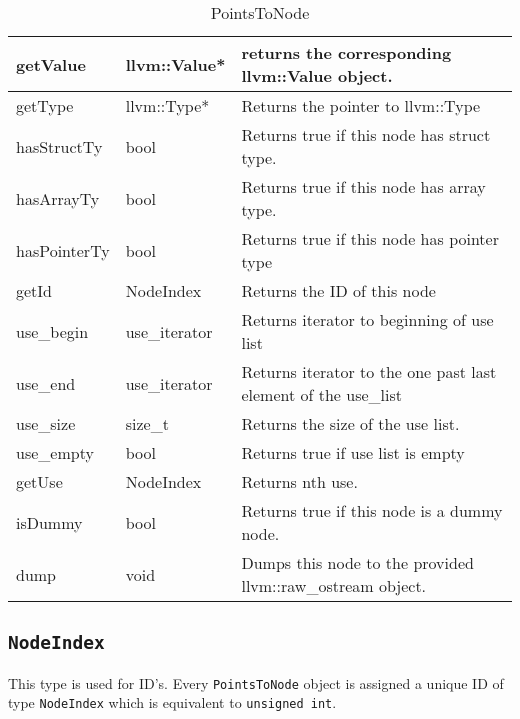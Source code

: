\documentclass[a4paper,12pt]{report}
\begin{document}
\begin{table}[]
\centering
\caption{PointsToNode}
\label{points-to-node}
\begin{tabular}{|l|l|l|}
\hline
getValue     & llvm::Value*  & returns the corresponding llvm::Value object.                               \\ \hline
getType      & llvm::Type*   & Returns the pointer to llvm::Type                                           \\ \hline
hasStructTy  & bool          & Returns true if this node has struct type.                                  \\ \hline
hasArrayTy   & bool          & Returns true if this node has array type.                                   \\ \hline
hasPointerTy & bool          & Returns true if this node has pointer type                                  \\ \hline
getId        & NodeIndex     & Returns the ID of this node                                                 \\ \hline
use\_begin   & use\_iterator & Returns iterator to beginning of use list                                   \\ \hline
use\_end     & use\_iterator & Returns iterator to the one past last element of the use\_list              \\ \hline
use\_size    & size\_t       & Returns the size of the use list.                                           \\ \hline
use\_empty   & bool          & Returns true if use list is empty                                           \\ \hline
getUse       & NodeIndex     & Returns nth use.                                                            \\ \hline
isDummy      & bool          & Returns true if this node is a dummy node.                                  \\ \hline
dump         & void          & Dumps this node to the provided llvm::raw\_ostream object.                  \\ \hline
\end{tabular}
\end{table}



\subsection{\texttt{NodeIndex}}
This type is used for ID's. Every \texttt{PointsToNode} object is assigned
a unique ID of type \texttt{NodeIndex} which is equivalent to \texttt{unsigned int}.
\end{document}

